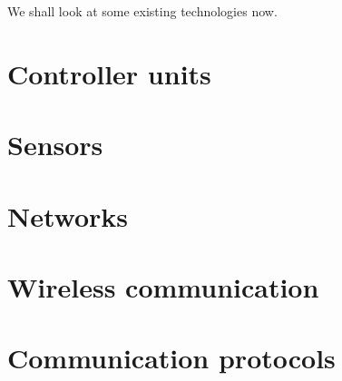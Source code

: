 We shall look at some existing technologies now.

\section{Controller units}


\section{Sensors}


\section{Networks}


\section{Wireless communication}


\section{Communication protocols}


